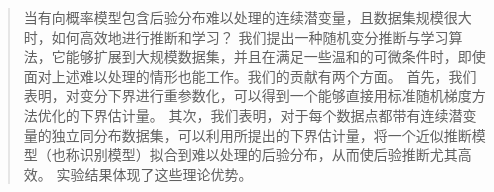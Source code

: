 \begin{abstract}
当有向概率模型包含后验分布难以处理的连续潜变量，且数据集规模很大时，如何高效地进行推断和学习？
我们提出一种随机变分推断与学习算法，它能够扩展到大规模数据集，并且在满足一些温和的可微条件时，即使面对上述难以处理的情形也能工作。我们的贡献有两个方面。
首先，我们表明，对变分下界进行重参数化，可以得到一个能够直接用标准随机梯度方法优化的下界估计量。
其次，我们表明，对于每个数据点都带有连续潜变量的独立同分布数据集，可以利用所提出的下界估计量，将一个近似推断模型（也称识别模型）拟合到难以处理的后验分布，从而使后验推断尤其高效。
实验结果体现了这些理论优势。
\end{abstract}
